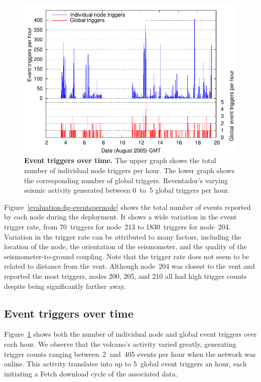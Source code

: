 \begin{figure}[t]
\label{evaluation-fig-eventspertime}
\begin{center}
\includegraphics[width=\hsize]{./5-evaluation/figs/eventdetection/eruptionTriggers/eruptCountVsTime.pdf}
\end{center}
\caption{\textbf{Event triggers over time.}
The upper graph shows the total number of individual node triggers per hour.
The lower graph shows the corresponding number of global triggers.
Reventador's varying seismic activity generated between 0~to~5 global
triggers per hour.}
\end{figure}

Figure~\ref{evaluation-fig-eventspernode} shows the total number of events
reported by each node during the deployment. It shows a wide variation in the
event trigger rate, from 70~triggers for node~213 to 1830~triggers for
node~204.  Variation in the trigger rate can be attributed to many factors,
including the location of the node, the orientation of the seismometer, and
the quality of the seismometer-to-ground coupling.  Note that the trigger
rate does not seem to be related to distance from the vent. Although node~204
was closest to the vent and reported the most triggers, nodes 200, 205, and
210 all had high trigger counts despite being significantly farther away.

\subsection{Event triggers over time}

Figure~\ref{evaluation-fig-eventspertime} shows both the number of individual
node and global event triggers over each hour. We observe that the volcano's
activity varied greatly, generating trigger counts ranging between~2~and~405
events per hour when the network was online.  This activity translates into
up to 5~global event triggers an hour, each initiating a Fetch download cycle
of the associated data.

